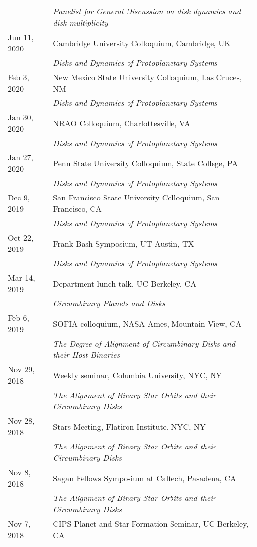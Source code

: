 \begin{longtable}{@{\hspace{10pt}}p{1.2in}l}
  & \emph{Panelist for General Discussion on disk dynamics and disk multiplicity} \\[\rowskip]
  Jun 11, 2020 & Cambridge University Colloquium, Cambridge, UK \\ 
  & \emph{Disks and Dynamics of Protoplanetary Systems} \\[\rowskip]
  Feb 3, 2020 & New Mexico State University Colloquium, Las Cruces, NM \\
  & \emph{Disks and Dynamics of Protoplanetary Systems} \\[\rowskip]
  Jan 30, 2020 & NRAO Colloquium, Charlottesville, VA \\
  & \emph{Disks and Dynamics of Protoplanetary Systems} \\[\rowskip]
  Jan 27, 2020 & Penn State University Colloquium, State College, PA \\
  & \emph{Disks and Dynamics of Protoplanetary Systems} \\[\rowskip]
  Dec 9, 2019 & San Francisco State University Colloquium, San Francisco, CA \\
  & \emph{Disks and Dynamics of Protoplanetary Systems} \\[\rowskip]
  Oct 22, 2019 & Frank Bash Symposium, UT Austin, TX \\
  & \emph{Disks and Dynamics of Protoplanetary Systems} \\[\rowskip]
  Mar 14, 2019 & Department lunch talk, UC Berkeley, CA \\
  & \emph{Circumbinary Planets and Disks} \\[\rowskip]
  Feb 6, 2019 & SOFIA colloquium, NASA Ames, Mountain View, CA \\
  & \emph{The Degree of Alignment of Circumbinary Disks and their Host Binaries} \\[\rowskip]
  Nov 29, 2018 & Weekly seminar, Columbia University, NYC, NY \\
  & \emph{The Alignment of Binary Star Orbits and their Circumbinary Disks} \\[\rowskip]
  Nov 28, 2018 & Stars Meeting, Flatiron Institute, NYC, NY \\
  & \emph{The Alignment of Binary Star Orbits and their Circumbinary Disks} \\[\rowskip]
  Nov 8, 2018 & Sagan Fellows Symposium at Caltech, Pasadena, CA \\
  & \emph{The Alignment of Binary Star Orbits and their Circumbinary Disks} \\[\rowskip]
  Nov 7, 2018 & CIPS Planet and Star Formation Seminar, UC Berkeley, CA  \\

\end{longtable}

